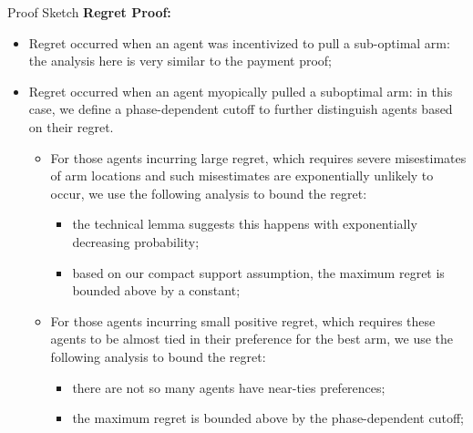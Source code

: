 \documentclass[final]{beamer} %
\begin{document}
\begin{frame}[t]
\begin{columns}[t]
\begin{column}{0.28\paperwidth}
\begin{block}{Proof Sketch}
\textbf{Regret Proof:}
\begin{itemize}[label=\textbullet]
\item Regret occurred when an agent was incentivized to pull a sub-optimal arm: the analysis here is very similar to the payment proof;
\item Regret occurred when an agent myopically pulled a suboptimal arm: in this case, we define a phase-dependent cutoff to further distinguish agents based on their regret.
\begin{itemize}[label=\textbullet]
\item For those agents incurring large regret, which requires severe misestimates of arm locations and such misestimates are exponentially unlikely to occur, we use the following analysis to bound the regret:
\begin{itemize}[label=$\star$]
\item the technical lemma suggests this happens with exponentially decreasing probability;
\item based on our compact support assumption, the maximum regret is bounded above by a constant;
\end{itemize}
\item For those agents incurring small positive regret, which requires these agents to be almost tied in their preference for the best arm, we use the following analysis to bound the regret: 
\begin{itemize}[label=$\star$] 
\item there are not so many agents have near-ties preferences; 
\item the maximum regret is bounded above by the phase-dependent cutoff;
\end{itemize}
\end{itemize}
\end{itemize}
\vspace{1cm}



\end{block}





\end{column}
\end{columns}
\end{frame}
\end{document}
